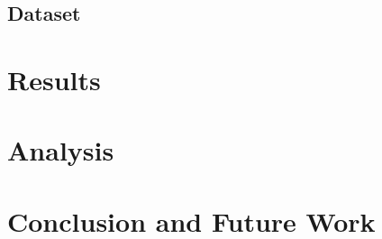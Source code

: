 \documentclass{article}
\begin{document}
\subsection{Dataset}

\section{Results}

\section{Analysis}


\section{Conclusion and Future Work}


\printbibliography
\end{document}
